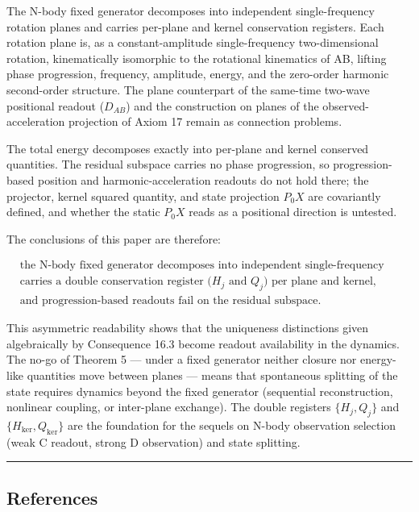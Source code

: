 \documentclass[
  a4paper,
]{article}
\begin{document}
The N-body fixed generator decomposes into independent single-frequency
rotation planes and carries per-plane and kernel conservation registers.
Each rotation plane is, as a constant-amplitude single-frequency
two-dimensional rotation, kinematically isomorphic to the rotational
kinematics of AB, lifting phase progression, frequency, amplitude,
energy, and the zero-order harmonic second-order structure. The plane
counterpart of the same-time two-wave positional readout (\(D_{AB}\))
and the construction on planes of the observed-acceleration projection
of Axiom 17 remain as connection problems.

The total energy decomposes exactly into per-plane and kernel conserved
quantities. The residual subspace carries no phase progression, so
progression-based position and harmonic-acceleration readouts do not
hold there; the projector, kernel squared quantity, and state projection
\(P_0X\) are covariantly defined, and whether the static \(P_0X\) reads
as a positional direction is untested.

The conclusions of this paper are therefore:

\[
\boxed{
\begin{aligned}
&\text{the N-body fixed generator decomposes into independent single-frequency rotation planes,}\\
&\text{carries a double conservation register (}H_j\text{ and }Q_j\text{) per plane and kernel,}\\
&\text{and progression-based readouts fail on the residual subspace.}
\end{aligned}
}
\]

This asymmetric readability shows that the uniqueness distinctions given
algebraically by Consequence 16.3 become readout availability in the
dynamics. The no-go of Theorem 5 --- under a fixed generator neither
closure nor energy-like quantities move between planes --- means that
spontaneous splitting of the state requires dynamics beyond the fixed
generator (sequential reconstruction, nonlinear coupling, or inter-plane
exchange). The double registers \(\{H_j,Q_j\}\) and
\(\{H_{\ker},Q_{\ker}\}\) are the foundation for the sequels on N-body
observation selection (weak C readout, strong D observation) and state
splitting.

\begin{center}\rule{0.5\linewidth}{0.5pt}\end{center}

\subsection{References}\label{references}
\end{document}
